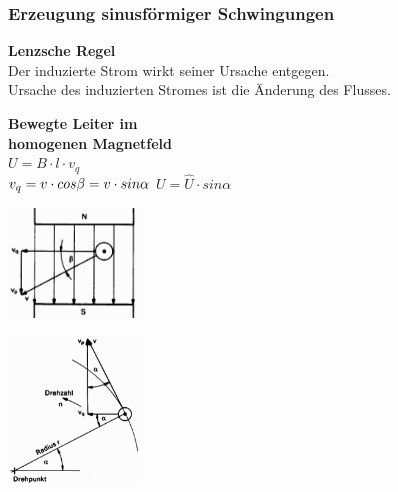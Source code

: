  		\subsubsection{Erzeugung sinusf\"ormiger Schwingungen}
 			\begin{minipage}{6cm}
 				\textbf{Lenzsche Regel}\\
 					Der induzierte Strom wirkt seiner Ursache entgegen.\\
 					Ursache des induzierten Stromes ist die \"Anderung des Flusses.
             \end{minipage}
             \hfill
 			\begin{minipage}{4.5cm}
 				\textbf{Bewegte Leiter im \\ homogenen Magnetfeld}\\
             	$U = B \cdot l \cdot v_q$ \\
             	             	$v_q = v \cdot cos\beta = v \cdot sin\alpha\\$
             	$U = \hat{U} \cdot sin \alpha$
             \end{minipage}
 			\begin{minipage}{3.5cm}
             	\includegraphics[width=3.5cm]{bilder/BewegteLeiter.png}
             \end{minipage}
 			\begin{minipage}{3.5cm}
             	\includegraphics[width=3.5cm]{bilder/KreisfoermigeBewegung.png}
             \end{minipage}
